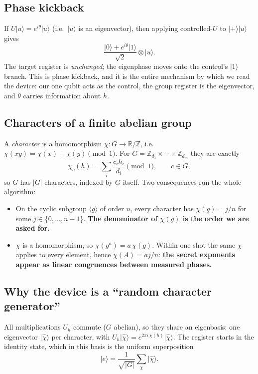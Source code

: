 \documentclass[11pt]{article}
\newcommand{\ket}[1]{\lvert #1 \rangle}
\newcommand{\Z}{\mathbb{Z}}
\newcommand{\R}{\mathbb{R}}
\theoremstyle{plain}
\theoremstyle{definition}
\begin{document}
\subsection{Phase kickback}

If $U\ket{u}=e^{i\theta}\ket{u}$ (i.e.\ $\ket{u}$ is an eigenvector), then
applying controlled-$U$ to $\ket{+}\ket{u}$ gives
\[
  \frac{\ket0 + e^{i\theta}\ket1}{\sqrt2}\otimes\ket{u}.
\]
The target register is \emph{unchanged}; the eigenphase moves onto the
control's $\ket1$ branch. This is phase kickback, and it is the entire
mechanism by which we read the device: our one qubit acts as the control,
the group register is the eigenvector, and $\theta$ carries information
about $h$.

\subsection{Characters of a finite abelian group}

A \emph{character} is a homomorphism $\chi : G \to \R/\Z$, i.e.\
$\chi(xy)=\chi(x)+\chi(y) \pmod 1$. For $G=\Z_{d_1}\times\cdots\times\Z_{d_m}$
they are exactly
\[
  \chi_c(h) = \sum_i \frac{c_i h_i}{d_i} \pmod 1, \qquad c\in G,
\]
so $G$ has $|G|$ characters, indexed by $G$ itself. Two consequences run
the whole algorithm:

\begin{itemize}[nosep]
  \item On the cyclic subgroup $\langle g\rangle$ of order $n$,
        every character has $\chi(g)=j/n$ for some
        $j\in\{0,\dots,n-1\}$. \textbf{The denominator of $\chi(g)$ is the
        order we are asked for.}
  \item $\chi$ is a homomorphism, so $\chi(g^a)=a\,\chi(g)$. Within one
        shot the same $\chi$ applies to every element, hence
        $\chi(A)=a j/n$: \textbf{the secret exponents appear as linear
        congruences between measured phases.}
\end{itemize}

\subsection{Why the device is a ``random character generator''}

All multiplications $U_h$ commute ($G$ abelian), so they share an
eigenbasis: one eigenvector $\ket{\hat\chi}$ per character, with
$U_h\ket{\hat\chi} = e^{2\pi i\,\chi(h)}\ket{\hat\chi}$.
The register starts in the identity state, which in this basis is the
uniform superposition
\[
  \ket{e} = \frac{1}{\sqrt{|G|}}\sum_\chi \ket{\hat\chi}.
\]
\end{document}
